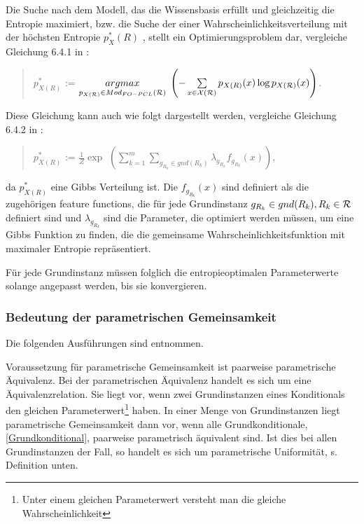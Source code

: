 \documentclass[draft]{scrreprt}
\begin{document}
Die Suche nach dem Modell, das die Wissensbasis erfüllt und gleichzeitig die Entropie maximiert, bzw. die Suche der einer Wahrscheinlichkeitsverteilung mit der höchsten Entropie $ p^*_X(R) $ , stellt ein Optimierungsproblem dar, vergleiche Gleichung 6.4.1 in \cite{Fis10}:
\begin{quote}
$ p^{*}_{X(R)} $ := $ \underset{p_{X(\cal{R})}\in Mod_{FO-PCL}(\cal{R})}{argmax} $
$ \left(- \sum\limits_{x \in \cal{X(R)}}p_{X(R)}(x)\log p_{X(\cal{R})} (x)\right) $$ $.\\
\end{quote}
Diese Gleichung kann auch wie folgt dargestellt werden, vergleiche Gleichung 6.4.2 in \cite{Fis10}:
\begin{quote}
$ p^{*}_{X(R)} $ := $ \frac{1}{Z} \exp $
$ \left(\sum\limits_{k=1}^{m} \sum\limits_{g_{R_{k}} \in gnd(R_{k})} \lambda_{g_{R_{k}}} f_{g_{R_{k}}}(x)\right) $$ $,\\
\end{quote}
da $ p^{*}_{X(R)} $ eine Gibbs Verteilung ist. Die $ f_{g_{R_{k}}}(x) $ sind definiert als die zugehörigen feature functions, die für jede Grundinstanz $ g_{R_{k}} \in gnd(R_{k}), R_{k} \in \cal{R} $ definiert sind und $ \lambda_{g_{R_{k}}}  $ sind die Parameter, die optimiert werden müssen, um eine Gibbs Funktion zu finden, die die gemeinsame Wahrscheinlichkeitsfunktion mit maximaler Entropie repräsentiert.

Für jede Grundinstanz müssen folglich die entropieoptimalen Parameterwerte solange angepasst werden, bis sie konvergieren. 

\subsubsection{Bedeutung der parametrischen Gemeinsamkeit}  
\label{sec:parÄ}
Die folgenden Ausführungen sind \cite[Kap. 7.1, S. 148ff]{Fis10} entnommen.

Voraussetzung für parametrische Gemeinsamkeit ist paarweise parametrische Äquivalenz.  Bei der parametrischen Äquivalenz  handelt es sich um eine Äquivalenzrelation. Sie liegt vor, wenn zwei Grundinstanzen eines Konditionals den gleichen Parameterwert\footnote{Unter einem gleichen Parameterwert versteht man die gleiche Wahrscheinlichkeit} haben. In einer Menge von Grundinstanzen liegt parametrische Gemeinsamkeit dann vor, wenn alle Grundkonditionale, \ref{Grundkonditional},  paarweise parametrisch äquivalent sind. Ist dies bei allen Grundinstanzen der Fall, so handelt es sich um parametrische Uniformität, s. Definition unten.
\end{document}

